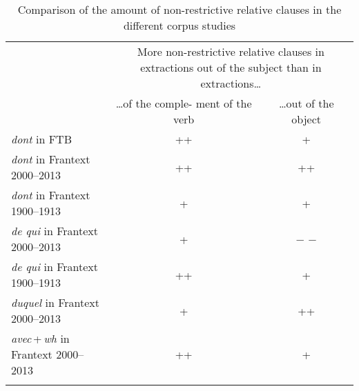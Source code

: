 \begin{table}
    \begin{tabular}{lcc}
         \lsptoprule
          & \multicolumn{2}{p{6cm}}{\raggedright\arraybackslash More non-restrictive relative clauses in extractions out of the subject than in extractions\dots}\\\addlinespace
          & \multicolumn{1}{p{3cm}}{\raggedright\arraybackslash \dots of the comple- ment of the verb} & \multicolumn{1}{p{3cm}}{\raggedright\arraybackslash \dots out of the object}\\
         \midrule
         \emph{dont} in FTB & ++ & + \\
         \emph{dont} in Frantext 2000--2013 & ++ & ++ \\
         \emph{dont} in Frantext 1900--1913 & + & + \\
         \emph{de qui} in Frantext 2000--2013 & + & − − \\
         \emph{de qui} in Frantext 1900--1913 & ++ & + \\
         \emph{duquel} in Frantext 2000--2013 & + & ++ \\
         \emph{avec}\,+\,\emph{wh} in Frantext 2000--2013 & ++ & + \\
         \lspbottomrule
    \end{tabular}
    \caption{Comparison of the amount of non-restrictive relative clauses in the different corpus studies}
    \label{tab:recap-corpus-restrictivity}
\end{table}
